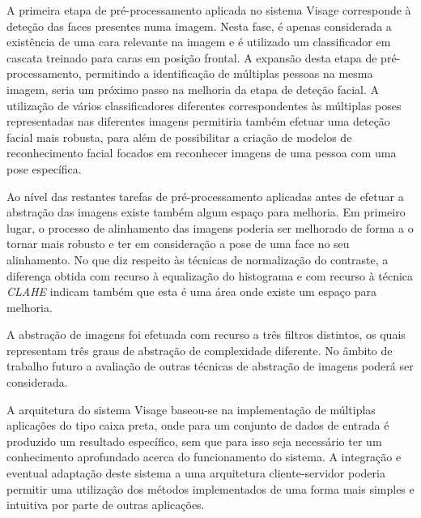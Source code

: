 A primeira etapa de pré-processamento aplicada no sistema Visage corresponde à deteção das faces presentes numa imagem. Nesta fase, é apenas considerada a existência de uma cara relevante na imagem e é utilizado um classificador em cascata treinado para caras em posição frontal. A expansão desta etapa de pré-processamento, permitindo a identificação de múltiplas pessoas na mesma imagem, seria um próximo passo na melhoria da etapa de deteção facial. A utilização de vários classificadores diferentes correspondentes às múltiplas poses representadas nas diferentes imagens permitiria também efetuar uma deteção facial mais robusta, para além de possibilitar a criação de modelos de reconhecimento facial focados em reconhecer imagens de uma pessoa com uma pose específica.

Ao nível das restantes tarefas de pré-processamento aplicadas antes de efetuar a abstração das imagens existe também algum espaço para melhoria. Em primeiro lugar, o processo de alinhamento das imagens poderia ser melhorado de forma a o tornar mais robusto e ter em consideração a pose de uma face no seu alinhamento. No que diz respeito às técnicas de normalização do contraste, a diferença obtida com recurso à equalização do histograma e com recurso à técnica \textit{CLAHE} indicam também que esta é uma área onde existe um espaço para melhoria.

A abstração de imagens foi efetuada com recurso a três filtros distintos, os quais representam três graus de abstração de complexidade diferente. No âmbito de trabalho futuro a avaliação de outras técnicas de abstração de imagens poderá ser considerada.

A arquitetura do sistema Visage baseou-se na implementação de múltiplas aplicações do tipo caixa preta, onde para um conjunto de dados de entrada é produzido um resultado específico, sem que para isso seja necessário ter um conhecimento aprofundado acerca do funcionamento do sistema. A integração e eventual adaptação deste sistema a uma arquitetura cliente-servidor poderia permitir uma utilização dos métodos implementados de uma forma mais simples e intuitiva por parte de outras aplicações.



